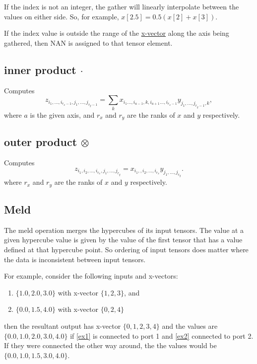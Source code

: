 If the index is not an integer, the gather will linearly interpolate
between the values on either side. So, for example,
$x[2.5] = 0.5 (x[2]+x[3])$.

If the index value is outside the range of the
\hyperref{x-vector}{x-vector (\S}{)}{x-vector} along the axis being gathered, then NAN is assigned
to that tensor element.

\subsection{inner product $\cdot$}\label{Operation:innerProduct}
Computes
\begin{displaymath}
  z_{i_1,\ldots,i_{r_x-1},j_1,\ldots,j_{r_y-1}} =
  \sum_k x_{i_1\ldots,i_{a-1},k,i_{a+1}\ldots,i_{r_x-1}}
  y_{j_1,\ldots,j_{r_y-1},k},
\end{displaymath}
where $a$ is the given axis, and $r_x$ and $r_y$ are the ranks of $x$
and $y$ respectively.

\subsection{outer product $\otimes$}\label{Operation:outerProduct}
Computes
\begin{displaymath}
  z_{i_1,i_2,\ldots,i_{r_x},j_1,\ldots,j_{r_y}} =
  x_{i_1,,i_2,\ldots,i_{r_x}}y_{j_1,\ldots,j_{r_y}}.
\end{displaymath}
where $r_x$ and $r_y$ are the ranks of $x$ and $y$ respectively.

\subsection{Meld}\label{Operation:meld}

The meld operation merges the hypercubes of its input tensors. The
value at a given hypercube value is given by the value of the first
tensor that has a value defined at that hypercube point. So ordering of
input tensors does matter where the data is inconsistent between input
tensors.

For example, consider the following inputs and x-vectors:

\begin{enumerate}
\item \label{ex1} $\{1.0, 2.0, 3.0\}$ with x-vector $\{1,2,3\}$, and
  \item \label {ex2} $\{0.0,1.5,4.0\}$ with x-vector $\{0,2,4\}$
  \end{enumerate}
then the resultant output has x-vector $\{0,1,2,3,4\}$ and the values
are $\{0.0,1.0,2.0,3.0,4.0\}$ if \ref{ex1} is connected to port 1 and
\ref{ex2} connected to port 2. If they were connected the other way
around, the the values would be $\{0.0,1.0,1.5,3.0,4.0\}$.


